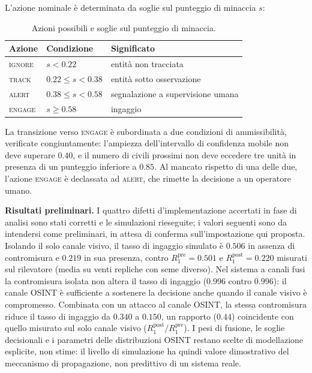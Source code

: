 L'azione nominale è determinata da soglie sul punteggio di minaccia $s$:

\begin{table}[htbp]
\centering
\begin{tabular}{llp{6.4cm}}
\toprule
\textbf{Azione} & \textbf{Condizione} & \textbf{Significato} \\
\midrule
\textsc{ignore} & $s < 0.22$ & entità non tracciata \\
\textsc{track} & $0.22 \le s < 0.38$ & entità sotto osservazione \\
\textsc{alert} & $0.38 \le s < 0.58$ & segnalazione a supervisione umana \\
\textsc{engage} & $s \ge 0.58$ & ingaggio \\
\bottomrule
\end{tabular}
\caption{Azioni possibili e soglie sul punteggio di minaccia.}
\label{tab:stati}
\end{table}

La transizione verso \textsc{engage} è subordinata a due condizioni di
ammissibilità, verificate congiuntamente: l'ampiezza dell'intervallo di
confidenza mobile non deve superare $0.40$, e il numero di civili prossimi non
deve eccedere tre unità in presenza di un punteggio inferiore a $0.85$. Al
mancato rispetto di una delle due, l'azione \textsc{engage} è declassata ad
\textsc{alert}, che rimette la decisione a un operatore umano.


\textbf{Risultati preliminari.} I quattro difetti d'implementazione accertati
in fase di analisi sono stati corretti e le simulazioni rieseguite; i valori
seguenti sono da intendersi come preliminari, in attesa di conferma
sull'impostazione qui proposta. Isolando il solo canale visivo, il tasso di
ingaggio simulato è $0.506$ in assenza di contromisura e $0.219$ in sua
presenza, contro $R_1^{\text{pre}} = 0.501$ e $R_1^{\text{post}} = 0.220$
misurati sul rilevatore (media su venti repliche con seme diverso). Nel
sistema a canali fusi la contromisura isolata non altera il tasso di ingaggio
($0.996$ contro $0.996$): il canale OSINT è sufficiente a sostenere la
decisione anche quando il canale visivo è compromesso. Combinata con un
attacco al canale OSINT, la stessa contromisura riduce il tasso di ingaggio da
$0.340$ a $0.150$, un rapporto ($0.44$) coincidente con quello misurato sul
solo canale visivo ($R_1^{\text{post}}/R_1^{\text{pre}}$). I pesi di fusione,
le soglie decisionali e i parametri delle distribuzioni OSINT restano scelte
di modellazione esplicite, non stime: il livello di simulazione ha quindi
valore dimostrativo del meccanismo di propagazione, non predittivo di un
sistema reale.


